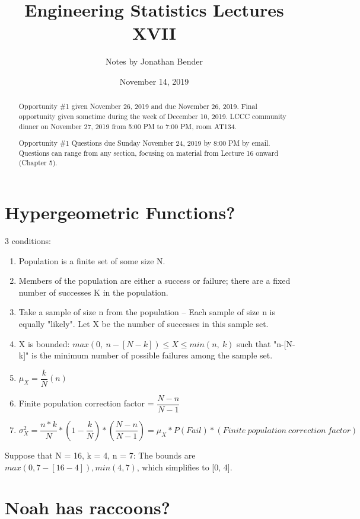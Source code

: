 \documentclass[]{article}
\title{Engineering Statistics Lectures XVII}
\author{Notes by Jonathan Bender}
\date{November 14, 2019}
\begin{document}
	
	\maketitle
	
	\begin{abstract}
		Opportunity \#1 given November 26, 2019 and due November 26, 2019.
		Final opportunity given sometime during the week of December 10, 2019.
		LCCC community dinner on November 27, 2019 from 5:00 PM to 7:00 PM, room AT134.
		
		Opportunity \#1 Questions due Sunday November 24, 2019 by 8:00 PM by email. Questions can range from any section, focusing on material from Lecture 16 onward (Chapter 5).
	\end{abstract}

	\section{Hypergeometric Functions?}
	
		3 conditions:
		\begin{enumerate}
			\item Population is a finite set of some size N.
			\item Members of the population are either a success or failure; there are a fixed number of successes K in the population.
			\item Take a sample of size n from the population -- Each sample of size n is equally "likely". Let X be the number of successes in this sample set.
			\item X is bounded: $max(0,\ n-[N-k]) \leq X \leq min(n,\ k)$ such that "n-[N-k]" is the minimum number of possible failures among the sample set.
			\item $\mu_X = \dfrac{k}{N}(n)$
			\item Finite population correction factor = $\dfrac{N-n}{N-1}$
			\item $\sigma_X^2 = \dfrac{n * k}{N} * (1-\dfrac{k}{N}) * (\dfrac{N-n}{N-1}) = \mu_X * P(Fail) * (Finite\ population\ correction\ factor)$
		\end{enumerate}
	
		Suppose that N = 16, k = 4, n = 7: The bounds are $max(0,7-[16-4]),min(4,7)$, which simplifies to [0, 4].
		
	
	\pagebreak
	\section{Noah has raccoons?}
		
\end{document}
